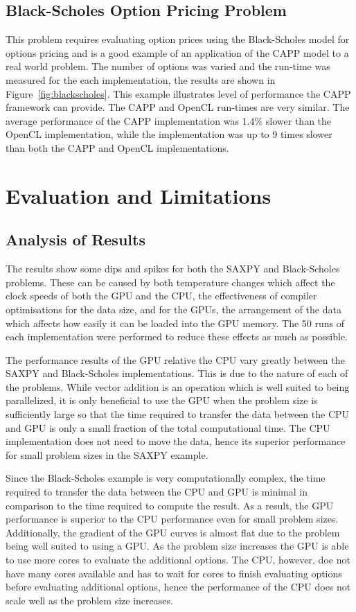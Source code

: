 \documentclass{sig-alternate-05-2015}
\begin{document}
\subsection{Black-Scholes Option Pricing Problem}

This problem requires evaluating option prices using the Black-Scholes 
model for options pricing and is a good example of an application of the CAPP 
model to a real world problem. The number of options was varied and the
run-time was measured for the each implementation, the results are shown in 
Figure~\ref{fig:blackscholes}. 
This example illustrates level of performance the  CAPP framework can
provide. The CAPP and OpenCL run-times are very similar. The average 
performance of the CAPP implementation was 1.4\% slower than the
OpenCL implementation, while the \CPP implementation was up to 9 times slower
than both the CAPP and OpenCL implementations.

\section{Evaluation and Limitations}\label{sec:evaluation}

\subsection{Analysis of Results}

The results show some dips and spikes for both the SAXPY and Black-Scholes
problems. These can be caused by both temperature changes which affect the clock speeds of both the GPU and
the CPU, the effectiveness of compiler optimisations for the data size, and for the GPUs, the arrangement of
the data which affects how easily it can be loaded into the GPU memory. The 50 runs of each implementation
were performed to reduce these effects as much as possible.

The performance results of the GPU relative the CPU vary greatly between the SAXPY and Black-Scholes
implementations. This is due to the nature of each of the problems. While vector addition is an operation
which is well
suited to being parallelized, it is only beneficial to use the GPU when the problem size is sufficiently large
so 
that the time required to transfer the data between the CPU and GPU is only a small fraction of the total
computational time. The CPU implementation does not need to move the data, hence its superior performance for
small problem sizes in the SAXPY example.

Since the Black-Scholes example is very computationally complex, the time required to transfer the data
between the CPU and GPU is minimal in comparison to the time required to compute the result. As a result, the GPU
performance is superior to the CPU performance even for small problem sizes. Additionally, the gradient of the
GPU curves is almost flat due to the problem being well suited to using a GPU. As the problem size increases
the GPU is able to use more cores to evaluate the additional options. The CPU, however, doe not have many
cores available and has to wait for cores to finish evaluating options before evaluating additional options, hence the performance of the CPU does not scale well as the problem size
increases.
\end{document}
